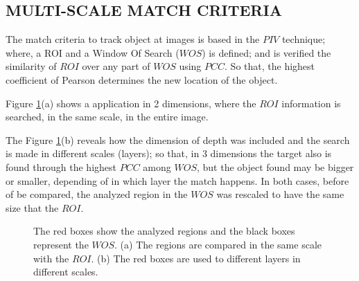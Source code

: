
\subsection{MULTI-SCALE MATCH CRITERIA}
The match criteria to track object at images is based in the $PIV$ technique; 
where, a ROI and a Window Of Search ($WOS$) is defined; and is 
verified the similarity of $ROI$ over any part of $WOS$ using $PCC$. 
So that, the highest coefficient of Pearson determines the new location of the object.

Figure \ref{fig:multires}(a) shows a application in 2 dimensions, where
the $ROI$ information is searched, in the same scale,  in the entire image.

The Figure \ref{fig:multires}(b) reveals how the dimension of depth was included and
the search is made in different scales (layers); so that, in 3 dimensions the target 
also is found through the highest $PCC$ among $WOS$, but the object found may be 
bigger or smaller, depending of in which layer the match happens. 
In both cases, before of be compared, the analyzed region in the $WOS$ was 
rescaled to have the same size that the $ROI$.

\begin{figure}[H]
\centering
  \caption{The red boxes show the analyzed regions and the black boxes represent the $WOS$. 
  (a) The regions are compared in the same scale with the $ROI$. 
  (b) The red boxes are used to different layers in different scales.}
  \label{fig:multires}
\end{figure}




